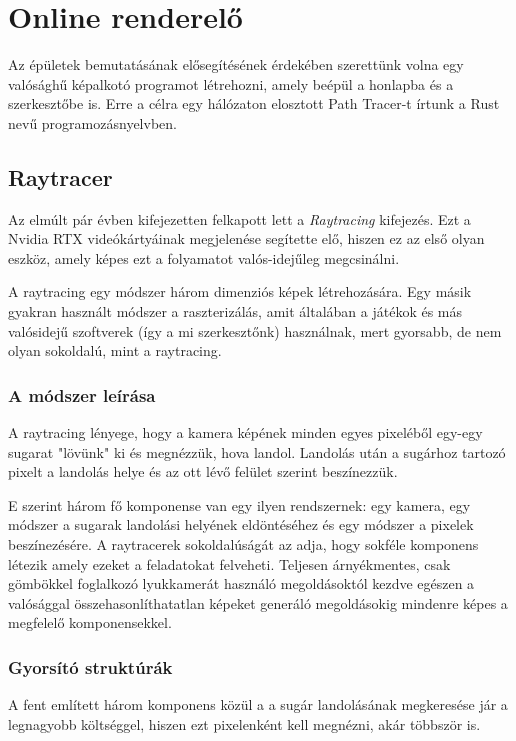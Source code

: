 \section{Online renderelő}
\label{raytracer}

Az épületek bemutatásának elősegítésének érdekében szerettünk volna egy valósághű képalkotó programot létrehozni, amely beépül a honlapba és a szerkesztőbe is. Erre a célra egy hálózaton elosztott Path Tracer-t írtunk a Rust nevű programozásnyelvben.

\subsection{Raytracer}
Az elmúlt pár évben kifejezetten felkapott lett a \emph{Raytracing} kifejezés. Ezt a Nvidia RTX videókártyáinak megjelenése segítette elő, hiszen ez az első olyan eszköz, amely képes ezt a folyamatot valós-idejűleg megcsinálni. 

A raytracing egy módszer három dimenziós képek létrehozására. Egy másik gyakran használt módszer a raszterizálás, amit általában a játékok és más valósidejű szoftverek (így a mi szerkesztőnk) használnak, mert gyorsabb, de nem olyan sokoldalú, mint a raytracing.

\subsubsection{A módszer leírása}
A raytracing lényege, hogy a kamera képének minden egyes pixeléből egy-egy sugarat "lövünk" ki és megnézzük, hova landol. Landolás után a sugárhoz tartozó pixelt a landolás helye és az ott lévő felület szerint beszínezzük.

E szerint három fő komponense van egy ilyen rendszernek: egy kamera, egy módszer a sugarak landolási helyének eldöntéséhez és egy módszer a pixelek beszínezésére. A raytracerek sokoldalúságát az adja, hogy sokféle komponens létezik amely ezeket a feladatokat felveheti. Teljesen árnyékmentes, csak gömbökkel foglalkozó lyukkamerát használó megoldásoktól kezdve egészen a valósággal összehasonlíthatatlan képeket generáló megoldásokig mindenre képes a megfelelő komponensekkel.

\subsubsection{Gyorsító struktúrák}

A fent említett három komponens közül a a sugár landolásának megkeresése jár a legnagyobb költséggel, hiszen ezt pixelenként kell megnézni, akár többször is.

